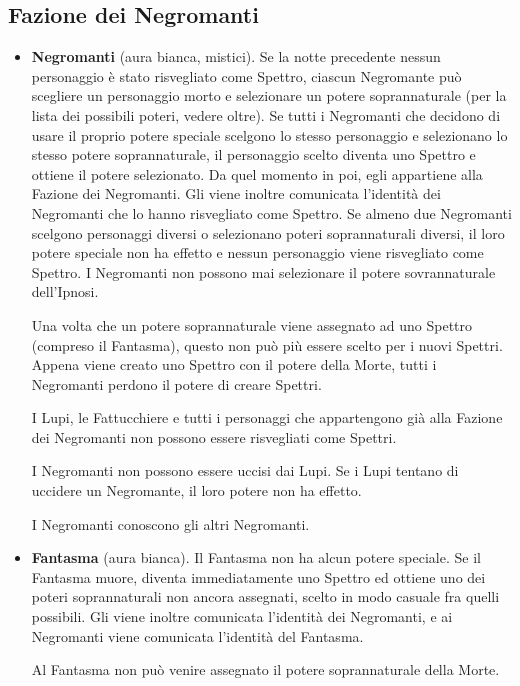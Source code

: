 \documentclass[a4paper,10pt]{article}
\begin{document}
\subsection*{Fazione dei Negromanti}
\label{negromanti}
\begin{itemize}

 \item {\bf Negromanti} (aura bianca, mistici).
 Se la notte precedente nessun personaggio è stato risvegliato come Spettro,
ciascun Negromante può scegliere un personaggio morto e selezionare un potere
soprannaturale (per la lista dei possibili poteri, vedere oltre).
 Se tutti i Negromanti che decidono di usare il proprio potere speciale scelgono
lo stesso personaggio e selezionano lo stesso potere soprannaturale, il
personaggio scelto diventa uno Spettro e ottiene il potere selezionato.
 Da quel momento in poi, egli appartiene alla Fazione dei Negromanti. Gli viene
inoltre comunicata l'identità dei Negromanti che lo hanno risvegliato come
Spettro.
 Se almeno due Negromanti scelgono personaggi diversi o selezionano poteri
soprannaturali diversi, il loro potere speciale non ha effetto e nessun
personaggio viene risvegliato come Spettro.
I Negromanti non possono mai selezionare il potere sovrannaturale dell'Ipnosi.
 
 Una volta che un potere soprannaturale viene assegnato ad uno Spettro (compreso
il Fantasma), questo non può più essere scelto per i nuovi Spettri. Appena viene
creato uno Spettro con il potere della Morte, tutti i Negromanti perdono il
potere di creare Spettri.
 
 I Lupi, le Fattucchiere e tutti i personaggi che appartengono già alla Fazione
dei Negromanti non possono essere risvegliati come Spettri.

 I Negromanti non possono essere uccisi dai Lupi. Se i Lupi tentano di uccidere
un Negromante, il loro potere non ha effetto.

 I Negromanti conoscono gli altri Negromanti.
 
 \item {\bf Fantasma} (aura bianca). Il Fantasma non ha alcun potere speciale.
Se il Fantasma muore, diventa immediatamente uno Spettro ed ottiene uno dei
poteri soprannaturali non ancora assegnati, scelto in modo casuale fra quelli
possibili. Gli viene inoltre comunicata l'identità dei Negromanti, e ai
Negromanti viene comunicata l'identità del Fantasma.
 
 Al Fantasma non può venire assegnato il potere soprannaturale della Morte.
 

\end{itemize}
\end{document}
